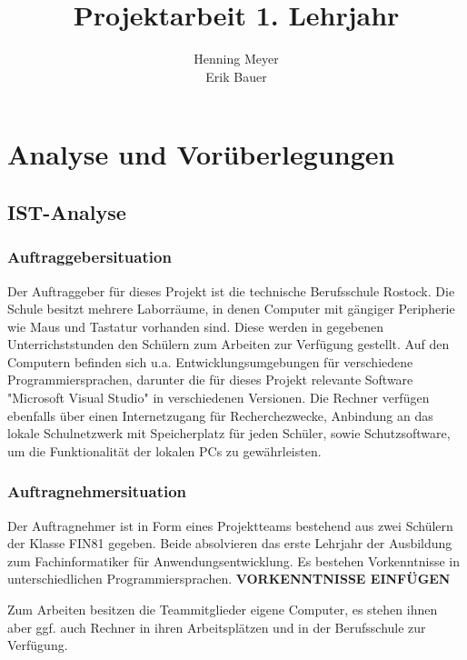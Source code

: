 \documentclass{article}
\title{Projektarbeit 1. Lehrjahr}
\author{Henning Meyer\\Erik Bauer}
\begin{document}

\maketitle
\newpage
\tableofcontents
\newpage


\section{Analyse und Vorüberlegungen}

\subsection{IST-Analyse}

\subsubsection{Auftraggebersituation}

    Der Auftraggeber für dieses Projekt ist die technische Berufsschule Rostock. Die Schule besitzt mehrere Laborräume, in denen Computer mit gängiger Peripherie wie Maus und Tastatur vorhanden sind. Diese werden in gegebenen Unterrichststunden den Schülern zum Arbeiten zur Verfügung gestellt.
    Auf den Computern befinden sich u.a. Entwicklungsumgebungen für verschiedene Programmiersprachen, darunter die für dieses Projekt relevante Software "Microsoft Visual Studio" in verschiedenen Versionen. Die Rechner verfügen ebenfalls über einen Internetzugang für Recherchezwecke, Anbindung an das lokale Schulnetzwerk mit Speicherplatz für jeden Schüler, sowie Schutzsoftware, um die Funktionalität der lokalen PCs zu gewährleisten.

\subsubsection{Auftragnehmersituation}

    Der Auftragnehmer ist in Form eines Projektteams bestehend aus zwei Schülern der Klasse FIN81 gegeben. Beide absolvieren das erste Lehrjahr der Ausbildung zum Fachinformatiker für Anwendungsentwicklung. Es bestehen Vorkenntnisse in unterschiedlichen Programmiersprachen. 
    \textbf{VORKENNTNISSE EINFÜGEN}%

    Zum Arbeiten besitzen die Teammitglieder eigene Computer, es stehen ihnen aber ggf. auch Rechner in ihren Arbeitsplätzen und in der Berufsschule zur Verfügung.
\end{document}
